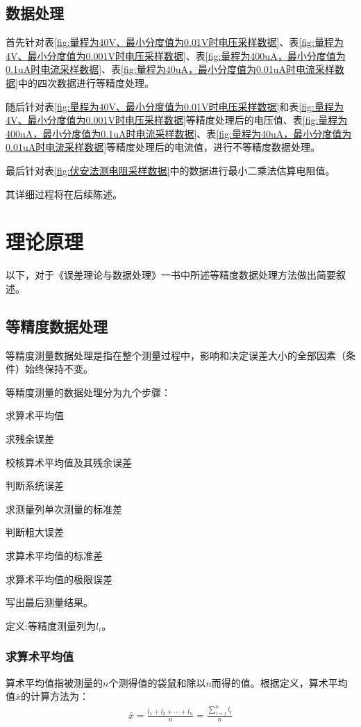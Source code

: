 \documentclass{ctexart}
\begin{document}
		\subsection{数据处理}
			首先针对表\ref{fig:量程为40V、最小分度值为0.01V时电压采样数据}、表\ref{fig:量程为4V、最小分度值为0.001V时电压采样数据}、表\ref{fig:量程为400uA，最小分度值为0.1uA时电流采样数据}、表\ref{fig:量程为40uA，最小分度值为0.01uA时电流采样数据}中的四次数据进行等精度处理。\par
			随后针对表\ref{fig:量程为40V、最小分度值为0.01V时电压采样数据}和表\ref{fig:量程为4V、最小分度值为0.001V时电压采样数据}等精度处理后的电压值、表\ref{fig:量程为400uA，最小分度值为0.1uA时电流采样数据}、表\ref{fig:量程为40uA，最小分度值为0.01uA时电流采样数据}等精度处理后的电流值，进行不等精度数据处理。\par
			最后针对表\ref{fig:伏安法测电阻采样数据}中的数据进行最小二乘法估算电阻值。\par
			其详细过程将在后续陈述。
	\section{理论原理}
		以下，对于《误差理论与数据处理》一书中所述等精度数据处理方法做出简要叙述。
		\subsection{等精度数据处理}
			等精度测量数据处理是指在整个测量过程中，影响和决定误差大小的全部因素（条件）始终保持不变。\par
			等精度测量的数据处理分为九个步骤：
			\begin{inparaenum}
				\item 求算术平均值
				\item 求残余误差
				\item 校核算术平均值及其残余误差
				\item 判断系统误差
				\item 求测量列单次测量的标准差
				\item 判断粗大误差
				\item 求算术平均值的标准差
				\item 求算术平均值的极限误差
				\item 写出最后测量结果。
			\end{inparaenum}\par
			
			定义:等精度测量列为$l_i$。
			\subsubsection{求算术平均值}
				算术平均值指被测量的$n$个测得值的袋鼠和除以$n$而得的值。根据定义，算术平均值$\bar{x}$的计算方法为：
				\begin{gather}
					\bar{x} =\frac{l_1+l_2+\cdots+l_n}{n}= \frac{\sum \limits_{i=1} ^{n} l_i}{n} 
					\label{fig:算术平均值公式}
				\end{gather}
\end{document}
